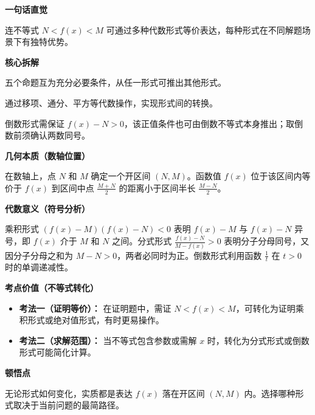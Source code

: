 \begin{explanationbox}
\textbf{\textcolor{CExplanation}{一句话直觉}}

连不等式 $N < f(x) < M$ 可通过多种代数形式等价表达，每种形式在不同解题场景下有独特优势。

\medskip
\textbf{\textcolor{CExplanation}{核心拆解}}
\begin{description}[style=nextline, leftmargin=2.8em, labelsep=0.5em, itemsep=0.45em]
    \item[\textbf{要点一（等价性）：}] 五个命题互为充分必要条件，从任一形式可推出其他形式。
    \item[\textbf{要点二（变形技巧）：}] 通过移项、通分、平方等代数操作，实现形式间的转换。
    \item[\textbf{要点三（条件注意）：}] 倒数形式需保证 $f(x)-N > 0$，该正值条件也可由倒数不等式本身推出；取倒数前须确认两数同号。
\end{description}

\medskip
\textbf{\textcolor{CExplanation}{几何本质（数轴位置）}}

在数轴上，点 $N$ 和 $M$ 确定一个开区间 $(N, M)$。函数值 $f(x)$ 位于该区间内等价于 $f(x)$ 到区间中点 $\frac{M+N}{2}$ 的距离小于区间半长 $\frac{M-N}{2}$。

\medskip
\textbf{\textcolor{CExplanation}{代数意义（符号分析）}}

乘积形式 $(f(x)-M)(f(x)-N) < 0$ 表明 $f(x)-M$ 与 $f(x)-N$ 异号，即 $f(x)$ 介于 $M$ 和 $N$ 之间。分式形式 $\frac{f(x)-N}{M-f(x)} > 0$ 表明分子分母同号，又因分子分母之和为 $M-N>0$，两者必同时为正。倒数形式利用函数 $\frac{1}{t}$ 在 $t>0$ 时的单调递减性。

\medskip
\textbf{\textcolor{CExplanation}{考点价值（不等式转化）}}
\begin{itemize}[leftmargin=*, itemsep=0.5em, topsep=0.4em]
    \item \textbf{考法一（证明等价）：} 在证明题中，需证 $N < f(x) < M$，可转化为证明乘积形式或绝对值形式，有时更易操作。
    \item \textbf{考法二（求解范围）：} 当不等式包含参数或需解 $x$ 时，转化为分式形式或倒数形式可能简化计算。
\end{itemize}

\medskip
\textbf{\textcolor{CExplanation}{顿悟点}}

无论形式如何变化，实质都是表达 $f(x)$ 落在开区间 $(N, M)$ 内。选择哪种形式取决于当前问题的最简路径。


\end{explanationbox}
